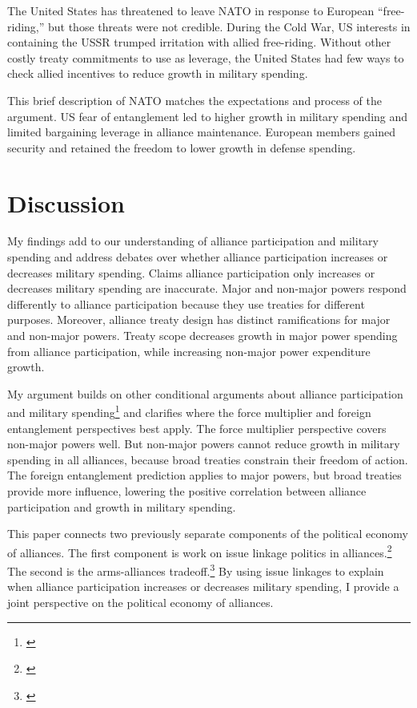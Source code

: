 \documentclass[12pt]{article}
\begin{document}
The United States has threatened to leave NATO in response to European ``free-riding,'' but those threats were not credible. 
During the Cold War, US interests in containing the USSR trumped irritation with allied free-riding.  
Without other costly treaty commitments to use as leverage, the United States had few ways to check allied incentives to reduce growth in military spending. 


This brief description of NATO matches the expectations and process of the argument. 
US fear of entanglement led to higher growth in military spending and limited bargaining leverage in alliance maintenance. 
European members gained security and retained the freedom to lower growth in defense spending.   


\section{Discussion}


My findings add to our understanding of alliance participation and military spending and address debates over whether alliance participation increases or decreases military spending. 
Claims alliance participation only increases or decreases military spending are inaccurate. 
Major and non-major powers respond differently to alliance participation because they use treaties for different purposes. 
Moreover, alliance treaty design has distinct ramifications for major and non-major powers. 
Treaty scope decreases growth in major power spending from alliance participation, while increasing non-major power expenditure growth. 


My argument builds on other conditional arguments about alliance participation and military spending\footnote{\cite{DigiuseppePoast2016}} and clarifies where the force multiplier and foreign entanglement perspectives best apply. 
The force multiplier perspective covers non-major powers well. 
But non-major powers cannot reduce growth in military spending in all alliances, because broad treaties constrain their freedom of action.
The foreign entanglement prediction applies to major powers, but broad treaties provide more influence, lowering the positive correlation between alliance participation and growth in military spending. 


This paper connects two previously separate components of the political economy of alliances. 
The first component is work on issue linkage politics in alliances.\footnote{\cite{Mattes2012, Poast2012, Poast2013, Johnson2015}} 
The second is the arms-alliances tradeoff.\footnote{\cite{Morrow1993}}
By using issue linkages to explain when alliance participation increases or decreases military spending, I provide a joint perspective on the political economy of alliances.  
\end{document}
